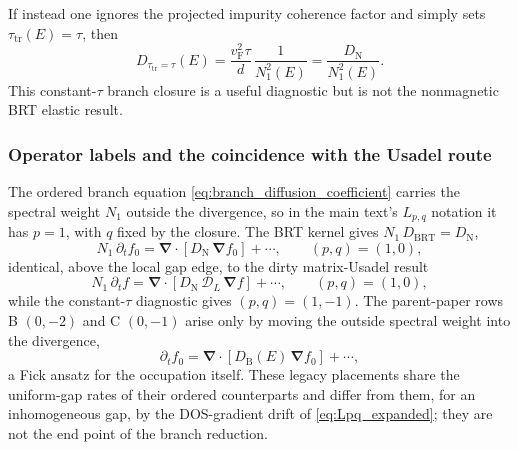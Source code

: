 \documentclass[
  aps,
  prb,
  preprint,
  superscriptaddress,
  longbibliography,
  nofootinbib
]{revtex4-2}
\newcommand{\bnabla}{\boldsymbol{\nabla}}
\newcommand{\vF}{v_{\mathrm{F}}}
\newcommand{\tautr}{\tau_{\mathrm{tr}}}
\newcommand{\DOS}{N_1}
\newcommand{\DN}{D_{\mathrm{N}}}
\begin{document}
If instead one ignores the projected impurity coherence factor and simply sets
\(\tautr(E)=\tau\), then
\begin{equation}
  D_{\tautr=\tau}(E)
  =
  \frac{\vF^2\tau}{d}\,\frac{1}{\DOS^2(E)}
  =
  \frac{\DN}{\DOS^2(E)} .
  \label{eq:branch_constant_tau_diffusion}
\end{equation}
This constant-\(\tau\) branch closure is a useful diagnostic but is not the
nonmagnetic BRT elastic result.

\subsubsection{Operator labels and the coincidence with the Usadel route}

The ordered branch equation \cref{eq:branch_diffusion_coefficient} carries
the spectral weight \(\DOS\) outside the divergence, so in the main text's
\(L_{p,q}\) notation it has \(p=1\), with \(q\) fixed by the closure. The
BRT kernel gives \(\DOS\,D_{\mathrm{BRT}}=\DN\),
\begin{equation}
  \DOS\,\partial_t f_0
  =
  \bnabla\cdot\!\left[
    \DN\,\bnabla f_0
  \right]
  + \cdots ,
  \qquad
  (p,q)=(1,0),
  \label{eq:branch_brt_operator}
\end{equation}
identical, above the local gap edge, to the dirty matrix-Usadel result
\begin{equation}
  \DOS\,\partial_t f
  =
  \bnabla\cdot\!\left[
    \DN\,\mathcal D_L\,\bnabla f
  \right]
  + \cdots ,
  \qquad
  (p,q)=(1,0),
  \label{eq:branch_compare_usadel}
\end{equation}
while the constant-\(\tau\) diagnostic gives \((p,q)=(1,-1)\). The
parent-paper rows B \((0,-2)\) and C \((0,-1)\) arise only by moving the
outside spectral weight into the divergence,
\begin{equation}
  \partial_t f_0
  =
  \bnabla\cdot\!\left[
    D_{\mathrm B}(E)\,\bnabla f_0
  \right]
  + \cdots ,
  \label{eq:branch_constant_tau_operator}
\end{equation}
a Fick ansatz for the occupation itself. These legacy placements share the
uniform-gap rates of their ordered counterparts and differ from them, for
an inhomogeneous gap, by the DOS-gradient drift of
\cref{eq:Lpq_expanded}; they are not the end point of the
branch reduction.
\end{document}
